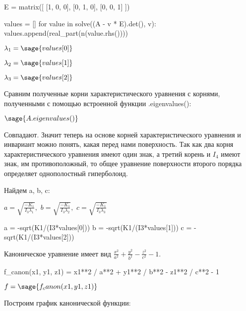 \documentclass{article}
\begin{document}
\begin{sageblock}
E = matrix([
    [1, 0, 0],
    [0, 1, 0],
    [0, 0, 1]
])

values = []
for value in solve((A - v * E).det(), v):
    values.append(real_part(n(value.rhs())))
\end{sageblock}

\begin{center}
$\lambda_1 = \sage{values[0]}$

$\lambda_2 = \sage{values[1]}$

$\lambda_3 = \sage{values[2]}$

\end{center}

Сравним полученные корни характеристического уравнения с корнями, полученными с помощью встроенной функции .eigenvalues():

$\sage{A.eigenvalues()}$

Совпадают. Значит теперь на основе корней характеристического уравнения и инвариант можно понять, какая перед нами поверхность. Так как два корня характеристического уравнения имеют один знак, а третий корень и $I_4$ имеют знак, им противоположный, то общее уравнение поверхности второго порядка определяет однополостный гиперболоид.

Найдем a, b, c:

$a = \sqrt{\frac{-K_1}{I_3\lambda_1}}, $
$b = \sqrt{\frac{-K_1}{I_3\lambda_2}}, $
$c = \sqrt{\frac{-K_1}{I_3\lambda_3}}$

\begin{sageblock}
a = -sqrt(K1/(I3*values[0]))
b = -sqrt(K1/(I3*values[1]))
c = -sqrt(K1/(I3*values[2]))
\end{sageblock}

Каноническое уравнение имеет вид $\frac{x^2}{a^2}+\frac{y^2}{b^2}-\frac{z^2}{c^2} - 1$.

\begin{sageblock}
f_canon(x1, y1, z1) = x1**2 / a**2 + y1**2 / b**2 - z1**2 / c**2 - 1
\end{sageblock}

$f = \sage{f_canon(x1, y1, z1)}$

Построим график канонической функции:

\begin{center}
\end{center}
\end{document}
